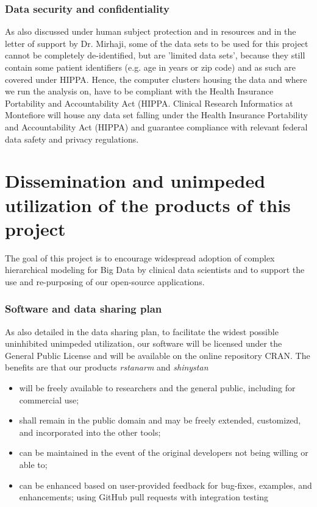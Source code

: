 \documentclass[11pt,notitlepage]{article}
\begin{document}
\subsubsection*{Data security and confidentiality}
As also discussed under human subject protection and in resources and in the letter of support by Dr. Mirhaji, some of the data sets to be used for this project cannot be completely de-identified, but are 'limited data sets', because they still contain some patient identifiers (e.g. age in years or zip code) and as such are covered under HIPPA. Hence, the computer clusters housing the data and where we run the analysis on, have to be compliant with the Health Insurance Portability and Accountability Act (HIPPA. Clinical Research Informatics at Montefiore will house any data set falling under the Health Insurance Portability and Accountability Act (HIPPA) and guarantee compliance with relevant federal data safety and privacy regulations. 

\section*{Dissemination and unimpeded utilization of the products of this project}
The goal of this project is to encourage widespread adoption of complex hierarchical modeling for Big Data by clinical data scientists and to support the use and re-purposing of our open-source applications. 

\subsubsection*{Software and data sharing plan}
As also detailed in the data sharing plan, to facilitate the widest possible uninhibited unimpeded utilization, our software will be licensed under the General Public License and will be available on the online repository CRAN. The benefits  are that our products \textit{rstanarm} and \textit{shinystan} 
 
\begin{itemize}
\item 
 will be freely available to researchers and the general public, including for commercial use; 
\item
shall remain in the public domain and may be freely extended, customized, and incorporated into the other tools; 
\item 
can be maintained in the event of the original developers not being willing
or able to; 
\item 
can be enhanced based on user-provided feedback for bug-fixes, examples, and enhancements; using GitHub pull requests with integration testing
\end{itemize}
\end{document}
